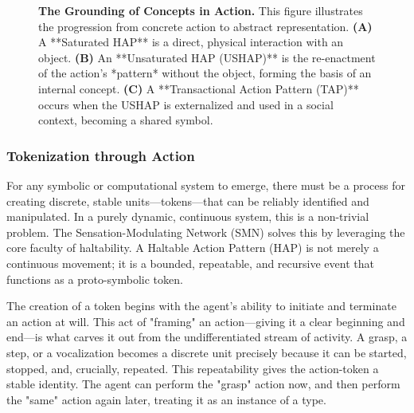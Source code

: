 \begin{figure}[ht]
    \centering
    \caption{\textbf{The Grounding of Concepts in Action.} This figure illustrates the progression from concrete action to abstract representation. \textbf{(A)} A **Saturated HAP** is a direct, physical interaction with an object. \textbf{(B)} An **Unsaturated HAP (USHAP)** is the re-enactment of the action's *pattern* without the object, forming the basis of an internal concept. \textbf{(C)} A **Transactional Action Pattern (TAP)** occurs when the USHAP is externalized and used in a social context, becoming a shared symbol.}
    \label{fig:saturation_spectrum}
\end{figure}

\subsubsection{Tokenization through Action}
\label{ssubsec:tokenization}
For any symbolic or computational system to emerge, there must be a process for creating discrete, stable units—tokens—that can be reliably identified and manipulated. In a purely dynamic, continuous system, this is a non-trivial problem. The Sensation-Modulating Network (SMN) solves this by leveraging the core faculty of haltability. A Haltable Action Pattern (HAP) is not merely a continuous movement; it is a bounded, repeatable, and recursive event that functions as a proto-symbolic token.

The creation of a token begins with the agent's ability to initiate and terminate an action at will. This act of "framing" an action—giving it a clear beginning and end—is what carves it out from the undifferentiated stream of activity. A grasp, a step, or a vocalization becomes a discrete unit precisely because it can be started, stopped, and, crucially, repeated. This repeatability gives the action-token a stable identity. The agent can perform the "grasp" action now, and then perform the "same" action again later, treating it as an instance of a type.

